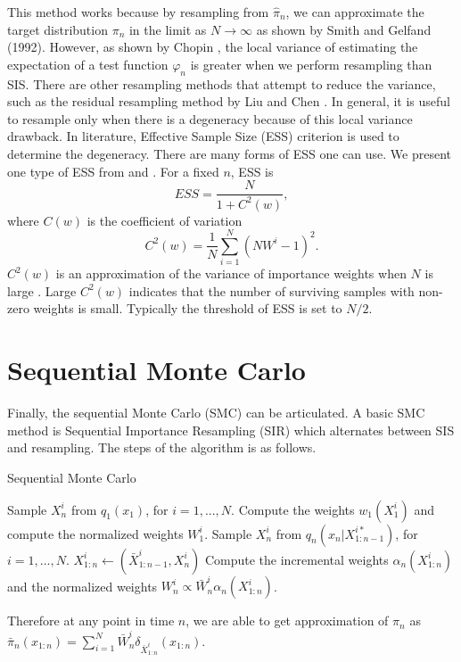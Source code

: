 \documentclass[10pt]{article}
\theoremstyle{definition}
\numberwithin{equation}{section}
\begin{document}
This method works because by resampling from $\hat{\pi}_n$, we can approximate the target distribution $\pi_n$ in the limit as $N \to \infty$ as shown by Smith and Gelfand (1992). However, as shown by Chopin \cite{chopin2004central}, the local variance of estimating the expectation of a test function $\varphi_n$ is greater when we perform resampling than SIS. There are other resampling methods that attempt to reduce the variance, such as the residual resampling method by Liu and Chen \cite{liu1995blind}. In general, it is useful to resample only when there is a degeneracy because of this local variance drawback. In literature, Effective Sample Size (ESS) criterion is used to determine the degeneracy. There are many forms of ESS one can use. We present one type of ESS from \cite{liu1995blind} and \cite{kong1994}. For a fixed $n$, ESS is 
\begin{equation}
	ESS = \dfrac{N}{1+C^2(w)},
\end{equation} where $C(w)$ is the coefficient of variation
\begin{equation}
	C^2(w) = \dfrac{1}{N}\sum_{i=1}^{N} (NW^i - 1)^2.
\end{equation}
$C^2(w)$ is an approximation of the variance of importance weights when $N$ is large \cite{liu1995blind}. Large $C^2(w)$ indicates that the number of surviving samples with non-zero weights is small. Typically the threshold of ESS is set to $N/2$. 
\section{Sequential Monte Carlo}
Finally, the sequential Monte Carlo (SMC) can be articulated. A basic SMC method is Sequential Importance Resampling (SIR) which alternates between SIS and resampling. The steps of the algorithm is as follows.

\begin{algorithm}
	\caption{Sequential Monte Carlo \cite{doucet2008} }\label{SIR}
	\begin{algorithmic}[1]
		\State Sample $X^i_n$ from $q_1(x_1)$, for $i = 1, ..., N$.
		\State Compute the weights $w_1(X^i_1)$ and compute the normalized weights $W^i_1$.
		\Else
		\EndIf
		\State Sample $X^i_n$ from $q_n(x_n|X^{i*}_{1:n-1})$, for $i = 1, ..., N$.
		\State $X^i_{1:n} \gets \left( \bar{X}^{i}_{1:n-1}, X^i_n \right)$
		\State Compute the incremental weights $\alpha_n(X^i_{1:n})$ and the normalized weights $W^i_n \propto \bar{W}^i_n \alpha_n(X^i_{1:n})$.
		\Else
		\EndIf
		\EndFor
	\end{algorithmic}
\end{algorithm}
Therefore at any point in time $n$, we are able to get approximation of $\pi_n$ as $\bar{\pi}_n(x_{1:n}) = \sum_{i=1}^{N} \bar{W}_n^i \delta_{\bar{X}^{i}_{1:n}} (x_{1:n})$.
\end{document}
